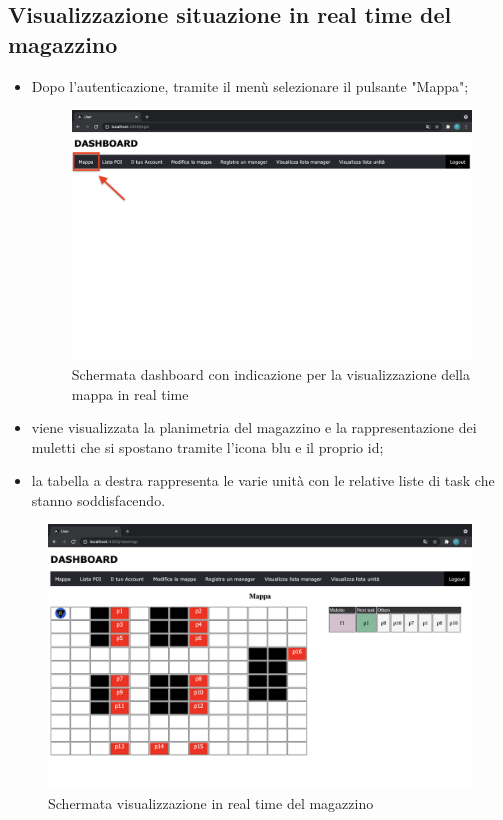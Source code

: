 \subsection{Visualizzazione situazione in real time del magazzino}
\begin{itemize}
    \item Dopo l'autenticazione, tramite il menù selezionare il pulsante "Mappa";
    \begin{figure}[H]
        \centering
        \includegraphics[scale=0.12]{res/images/dashboard1.png}
        \caption{Schermata dashboard con indicazione per la visualizzazione della mappa in real time}
    \end{figure}
    \item viene visualizzata la planimetria del magazzino e la rappresentazione dei muletti che si spostano tramite l'icona blu e il proprio id;
    \item la tabella a destra rappresenta le varie unità con le relative liste di task che stanno soddisfacendo.
    
\end{itemize}

\begin{figure}[H]
    \centering
    \includegraphics[scale=0.12]{res/images/map_user.png}
    \caption{Schermata visualizzazione in real time del magazzino}
\end{figure}

